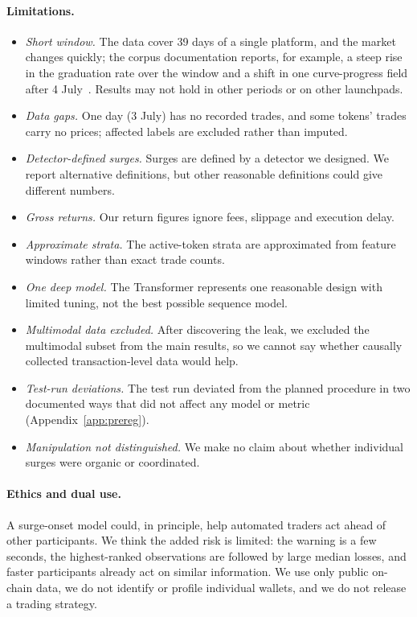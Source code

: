 \paragraph{Limitations.}
\begin{itemize}
  \item \emph{Short window.} The data cover 39 days of a single platform, and the market changes quickly; the corpus documentation reports, for example, a steep rise in the graduation rate over the window and a shift in one curve-progress field after 4 July~\citep{slinkdev2026corpus}. Results may not hold in other periods or on other launchpads.
  \item \emph{Data gaps.} One day (3 July) has no recorded trades, and some tokens' trades carry no prices; affected labels are excluded rather than imputed.
  \item \emph{Detector-defined surges.} Surges are defined by a detector we designed. We report alternative definitions, but other reasonable definitions could give different numbers.
  \item \emph{Gross returns.} Our return figures ignore fees, slippage and execution delay.
  \item \emph{Approximate strata.} The active-token strata are approximated from feature windows rather than exact trade counts.
  \item \emph{One deep model.} The Transformer represents one reasonable design with limited tuning, not the best possible sequence model.
  \item \emph{Multimodal data excluded.} After discovering the leak, we excluded the multimodal subset from the main results, so we cannot say whether causally collected transaction-level data would help.
  \item \emph{Test-run deviations.} The test run deviated from the planned procedure in two documented ways that did not affect any model or metric (Appendix~\ref{app:prereg}).
  \item \emph{Manipulation not distinguished.} We make no claim about whether individual surges were organic or coordinated.
\end{itemize}

\paragraph{Ethics and dual use.}
A surge-onset model could, in principle, help automated traders act ahead of other participants. We think the added risk is limited: the warning is a few seconds, the highest-ranked observations are followed by large median losses, and faster participants already act on similar information. We use only public on-chain data, we do not identify or profile individual wallets, and we do not release a trading strategy.
